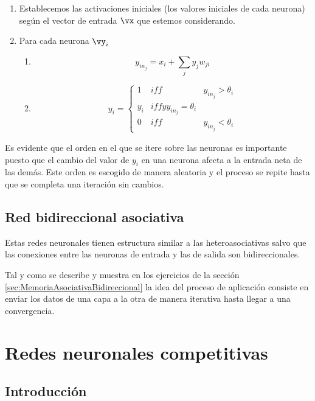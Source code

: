 \begin{enumerate}
\item Establecemos las activaciones iniciales (los valores iniciales de cada neurona) según el vector de entrada $\vx$ que estemos considerando.
\item Para cada neurona $\vy_i$
\begin{enumerate}
\item \[y_{in_j} = x_i +\sum_j y_jw_{ji}\]
\item \[y_i = \left\{ \begin{array}{lll}
1 & iff & y_{in_j}> \theta_i \\
y_i & iff y y_{in_j} = \theta_i \\
0 & iff & y_{in_j}<\theta_i
\end{array}\right.\]
\end{enumerate}
\end{enumerate}

Es evidente que el orden en el que se itere sobre las neuronas es importante puesto que el cambio del valor de $y_i$ en una neurona afecta a la entrada neta de las demás. Este orden es escogido de manera aleatoria y el proceso se repite hasta que se completa una iteración sin cambios.

\subsection{Red bidireccional asociativa}
\begin{defn}
Estas redes neuronales tienen estructura similar a las heteroasociativas salvo que las conexiones entre las neuronas de entrada y las de salida son bidireccionales.

Tal y como se describe y muestra en los ejercicios de la sección \ref{sec:MemoriaAsociativaBidireccional} la idea del proceso de aplicación consiste en enviar los datos de una capa a la otra de manera iterativa hasta llegar a una convergencia.
\end{defn}


\section{Redes neuronales competitivas}
\subsection{Introducción}

